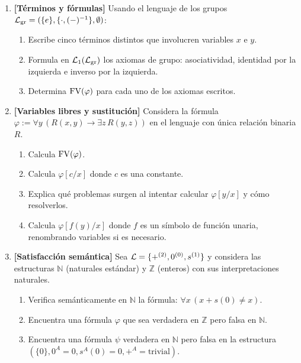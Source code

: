 \medskip

\begin{enumerate}[leftmargin=2em, label=\textbf{Problema \arabic*.}, itemsep=1em]

  \item \textbf{[Términos y fórmulas]}
  Usando el lenguaje de los grupos $\mathcal{L}_{\mathrm{gr}} = (\{e\}, \{\cdot, (-)^{-1}\}, \emptyset)$:
  \begin{enumerate}[label=(\alph*)]
    \item Escribe cinco términos distintos que involucren variables $x$ e $y$.
    \item Formula en $\mathcal{L}_1(\mathcal{L}_{\mathrm{gr}})$ los axiomas de grupo: asociatividad, identidad por la izquierda e inverso por la izquierda.
    \item Determina $\mathrm{FV}(\varphi)$ para cada uno de los axiomas escritos.
  \end{enumerate}

  \item \textbf{[Variables libres y sustitución]}
  Considera la fórmula $\varphi := \forall y\, (R(x,y) \to \exists z\, R(y,z))$ en el lenguaje con única relación binaria $R$.
  \begin{enumerate}[label=(\alph*)]
    \item Calcula $\mathrm{FV}(\varphi)$.
    \item Calcula $\varphi[c/x]$ donde $c$ es una constante.
    \item Explica qué problemas surgen al intentar calcular $\varphi[y/x]$ y cómo resolverlos.
    \item Calcula $\varphi[f(y)/x]$ donde $f$ es un símbolo de función unaria, renombrando variables si es necesario.
  \end{enumerate}

  \item \textbf{[Satisfacción semántica]}
  Sea $\mathcal{L} = \{+^{(2)}, 0^{(0)}, s^{(1)}\}$ y considera las estructuras $\mathbb{N}$ (naturales estándar) y $\mathbb{Z}$ (enteros) con sus interpretaciones naturales.
  \begin{enumerate}[label=(\alph*)]
    \item Verifica semánticamente en $\mathbb{N}$ la fórmula: $\forall x\,(x + s(0) \neq x)$.
    \item Encuentra una fórmula $\varphi$ que sea verdadera en $\mathbb{Z}$ pero falsa en $\mathbb{N}$.
    \item Encuentra una fórmula $\psi$ verdadera en $\mathbb{N}$ pero falsa en la estructura $(\{0\}, 0^A = 0, s^A(0) = 0, +^A = \text{trivial})$.
  \end{enumerate}


\end{enumerate}
